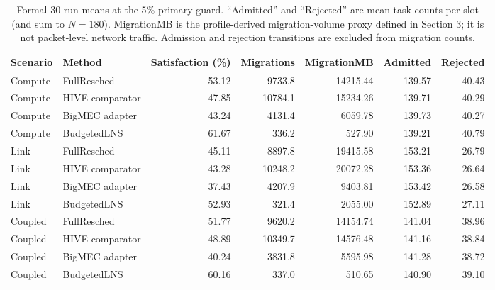 \begin{table}[H]
\centering
\caption{Formal 30-run means at the 5\% primary guard. ``Admitted'' and ``Rejected'' are mean task counts per slot (and sum to $N=180$). MigrationMB is the profile-derived migration-volume proxy defined in Section 3; it is not packet-level network traffic. Admission and rejection transitions are excluded from migration counts.}
\label{tab:main-results}
\scriptsize
\setlength{\tabcolsep}{3.5pt}
\begin{tabular}{llrrrrr}
\toprule
Scenario & Method & Satisfaction (\%) & Migrations & MigrationMB & Admitted & Rejected \\
\midrule
Compute & FullResched & 53.12 & 9733.8 & 14215.44 & 139.57 & 40.43 \\
Compute & HIVE comparator & 47.85 & 10784.1 & 15234.26 & 139.71 & 40.29 \\
Compute & BigMEC adapter & 43.24 & 4131.4 & 6059.78 & 139.73 & 40.27 \\
Compute & BudgetedLNS & 61.67 & 336.2 & 527.90 & 139.21 & 40.79 \\
\addlinespace
Link & FullResched & 45.11 & 8897.8 & 19415.58 & 153.21 & 26.79 \\
Link & HIVE comparator & 43.28 & 10248.2 & 20072.28 & 153.36 & 26.64 \\
Link & BigMEC adapter & 37.43 & 4207.9 & 9403.81 & 153.42 & 26.58 \\
Link & BudgetedLNS & 52.93 & 321.4 & 2055.00 & 152.89 & 27.11 \\
\addlinespace
Coupled & FullResched & 51.77 & 9620.2 & 14154.74 & 141.04 & 38.96 \\
Coupled & HIVE comparator & 48.89 & 10349.7 & 14576.48 & 141.16 & 38.84 \\
Coupled & BigMEC adapter & 40.24 & 3831.8 & 5595.98 & 141.28 & 38.72 \\
Coupled & BudgetedLNS & 60.16 & 337.0 & 510.65 & 140.90 & 39.10 \\
\bottomrule
\end{tabular}
\end{table}

